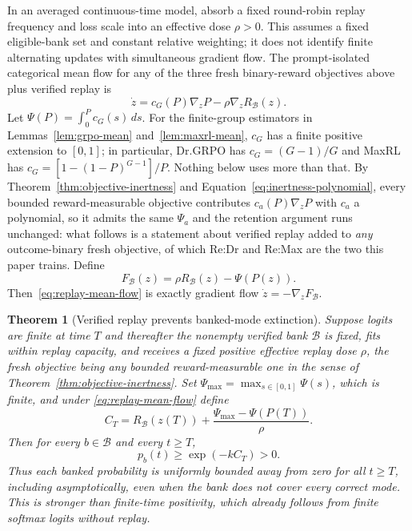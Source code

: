 \documentclass{article}
\newcommand{\1}{\mathbf 1}
\newtheorem{theorem}[lemma]{Theorem}
\theoremstyle{remark}
\theoremstyle{definition}
\theoremstyle{plain}
\begin{document}
In an averaged continuous-time model, absorb a fixed round-robin replay
frequency and loss scale into an effective dose $\rho>0$. This assumes a
fixed eligible-bank set and constant relative weighting; it does not identify
finite alternating updates with simultaneous gradient flow. The prompt-isolated categorical mean flow for any of the three fresh
binary-reward objectives above plus verified replay is
\begin{equation}
  \dot z
  =c_G(P)\nabla_zP-\rho\nabla_zR_{\mathcal B}(z).
  \label{eq:replay-mean-flow}
\end{equation}
Let $\Psi(P)=\int_0^P c_G(s)\,ds$. For the finite-group estimators in Lemmas~\ref{lem:grpo-mean}
and~\ref{lem:maxrl-mean}, $c_G$ has a finite positive extension to $[0,1]$;
in particular, Dr.GRPO has $c_G=(G-1)/G$ and MaxRL has
$c_G=[1-(1-P)^{G-1}]/P$. Nothing below uses more than that. By
Theorem~\ref{thm:objective-inertness} and
Equation~\eqref{eq:inertness-polynomial}, every bounded reward-measurable
objective contributes $c_a(P)\nabla_zP$ with $c_a$ a polynomial, so it admits
the same $\Psi_a$ and the retention argument runs unchanged: what follows is a
statement about verified replay added to \emph{any} outcome-binary fresh
objective, of which Re:Dr and Re:Max are the two this paper trains. Define
\begin{equation}
  F_{\mathcal B}(z)=\rho R_{\mathcal B}(z)-\Psi(P(z)).
  \label{eq:replay-potential}
\end{equation}
Then~\eqref{eq:replay-mean-flow} is exactly gradient flow
$\dot z=-\nabla_zF_{\mathcal B}$.

\begin{theorem}[Verified replay prevents banked-mode extinction]
\label{thm:replay-retention}
Suppose logits are finite at time $T$ and thereafter the nonempty verified
bank $\mathcal B$ is fixed, fits within replay capacity, and receives a
fixed positive effective replay dose $\rho$, the fresh objective being any
bounded reward-measurable one in the sense of
Theorem~\ref{thm:objective-inertness}. Set
$\Psi_{\max}=\max_{s\in[0,1]}\Psi(s)$, which is finite, and under
\eqref{eq:replay-mean-flow} define
\[
  C_T
  =R_{\mathcal B}(z(T))
   +\frac{\Psi_{\max}-\Psi(P(T))}{\rho}.
\]
Then for every $b\in\mathcal B$ and every $t\ge T$,
\begin{equation}
  p_b(t)\ge \exp(-kC_T)>0.
  \label{eq:replay-retention-bound}
\end{equation}
Thus each banked probability is uniformly bounded away from zero for all
$t\ge T$, including asymptotically, even when the bank does not cover every
correct mode. This is stronger than finite-time positivity, which already
follows from finite softmax logits without replay.
\end{theorem}
\end{document}
